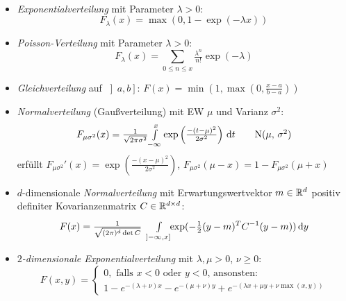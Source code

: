 \documentclass{cheat-sheet}
\begin{document}
\begin{defn}\mbox{}\\
  \begin{itemize}
    \item \emph{Exponentialverteilung} mit Parameter $\lambda > 0$:
    \[ F_{\lambda}(x) = \max(0, 1 - \exp(- \lambda x)) \tag*{Exp($\lambda$)} \]
    \item \emph{Poisson-Verteilung} mit Parameter $\lambda > 0$:
    \[ F_{\lambda}(x) = \sum_{0 \leq n \leq x} \tfrac{\lambda^n}{n!} \exp(-\lambda) \tag*{Poi($\lambda$)} \]
    \item \emph{Gleichverteilung} auf $\left] a, b \right]$: $F(x) = \min(1, \max(0, \tfrac{x - a}{b - a}))$
    \item \emph{Normalverteilung} (Gaußverteilung) mit EW $\mu$ und Varianz $\sigma^2$:
    \[ F_{\mu \sigma^2}(x) = \tfrac{1}{\sqrt{2 \pi \sigma^2}} {\textstyle \int\limits_{-\infty}^{x}} \exp\left(\tfrac{-(t-\mu)^2}{2 \sigma^2}\right) \,\mathrm{d} t \tag*{N($\mu$, $\sigma^2$)} \]
    erfüllt $F_{\mu \sigma^2}'(x) = \exp\left(\tfrac{-(x-\mu)^2}{2 \sigma^2}\right)$, $F_{\mu \sigma^2}(\mu-x) = 1 - F_{\mu \sigma^2}(\mu+x)$
    \item $d$-dimensionale \emph{Normalverteilung} mit Erwartungswertvektor $m \in \mathbb{R}^d$ positiv definiter Kovarianzenmatrix $C \in \mathbb{R}^{d \times d}$:
    \[ F(x) = \tfrac{1}{\sqrt{(2 \pi)^d \det C}} \enspace {\textstyle \int\limits_{\left] -\infty, x \right]}^{}} \!\! \exp(- \tfrac{1}{2} (y-m)^T C^{-1} (y-m)) \,\mathrm{d} y \]
    \item \emph{$2$-dimensionale Exponentialverteilung} mit $\lambda, \mu > 0$, $\nu \geq 0$:
    \[ F(x, y) = \begin{cases} 0, \text{ falls $x < 0$ oder $y < 0$, ansonsten:} \\ 1 - e^{-(\lambda {+} \nu) x} - e^{-(\mu {+} \nu) y} + e^{-(\lambda x {+} \mu y {+} \nu \max(x, y))} \end{cases} \]
  \end{itemize}
\end{defn}

\end{document}
